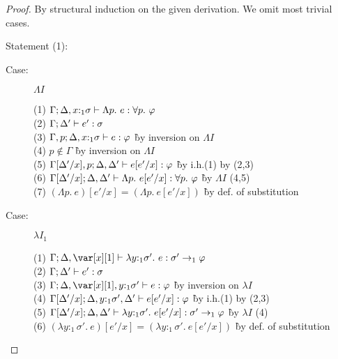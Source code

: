 \begin{proof}
By structural induction on the given derivation. We omit most trivial cases.

Statement (1):

\begin{description}
  
\item[Case:] $\Lambda I$
\begin{tabbing}
  (1) $\Gamma; \Delta, x{:}_1\sigma \vdash \Lambda p.~e : \forall p.~\varphi$\\
  (2) $\Gamma; \Delta' \vdash e' : \sigma$\\
  (3) $\Gamma, p; \Delta,x{:}_1\sigma \vdash e : \varphi$ \` by inversion on $\Lambda I$\\
  (4) $p \notin \Gamma$ \` by inversion on $\Lambda I$\\
  (5) $\Gamma[\Delta'/x],p; \Delta,\Delta' \vdash e[e'/x] : \varphi$ \` by i.h.(1) by (2,3)\\
  (6) $\Gamma[\Delta'/x];\Delta,\Delta' \vdash \Lambda p.~e[e'/x] : \forall p.~\varphi$ \` by $\Lambda I$ (4,5)\\
  (7) $(\Lambda p.~e)[e'/x] = (\Lambda p.~e[e'/x])$ \` by def. of substitution\\
\end{tabbing}


\item[Case:] $\lambda I_1$
\begin{tabbing}
  (1) $\G; \D, \xl \vdash \lambda y{:}_1\sigma'.~e : \sigma' \to_1 \varphi$\\
  (2) $\Gamma; \Delta' \vdash e' : \sigma$\\
  (3) $\G; \D, \xl, y{:}_1\sigma' \vdash e : \varphi$ \` by inversion on $\lambda I$\\
  (4) $\Gamma[\Delta'/x]; \Delta, y{:}_1\sigma', \Delta' \vdash e[e'/x] : \varphi$ \` by i.h.(1) by (2,3)\\
  (5) $\Gamma[\Delta'/x]; \Delta,\Delta' \vdash \lambda y{:}_1\sigma'.~e[e'/x] : \sigma' \to_1 \varphi$ \` by $\lambda I$ (4)\\
  (6) $(\lambda y{:}_1\sigma'.~e)[e'/x] = (\lambda y{:}_1\sigma'.~e[e'/x])$ \` by def. of substitution\\
\end{tabbing}


\end{description}
\end{proof}
